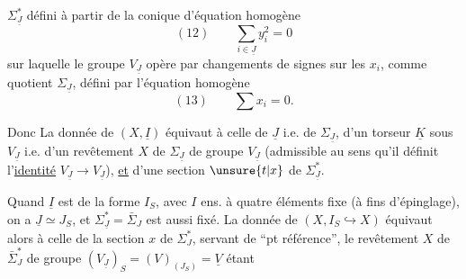 $\Sigma^*_{\underline J}$ défini  à partir de la  conique  d'équation homogène
\[
(12)\qquad\sum_{i\in\underline J}y_i^2=0
\]
sur laquelle le groupe $V_{\underline J}$  opère  par changements de signes sur les $x_i$,  comme quotient $\Sigma_{\underline J}$, défini par l'équation homogène
\[
(13)\qquad\sum x_i=0.
\]

Donc La donnée de $(X,\underline I)$ équivaut à celle de \deleted{\unsure{$\Sigma$}} $\underline J$ i.e. de $\Sigma_{\underline J}$, d'un torseur $\underline K$ sous $V_{\underline J}$ i.e. d'un revêtement $X$ de $\Sigma_{\underline J}$  de groupe $V_{\underline J}$ (admissible au sens qu'il définit l'\uline{identité} $V_{\underline J}\longrightarrow V_{\underline J}$), \uline{et} d'une section $\unsure{t|x}$ de $\Sigma^*_{\underline J}$.

Quand $\underline I$ est  de la forme $I_S$, avec $I$ ens. à quatre éléments fixe (à fins d'épinglage), on a $\underline J\simeq J_S$, et $\Sigma^*_{\underline J}=\bar\Sigma_J$ est aussi fixé. La donnée de $(X,I_S\hookrightarrow X)$ équivaut alors à celle de la section $x$ de $\Sigma^*_J$, servant de ``pt référence'', le revêtement $X$ de $\bar\Sigma^*_J$ de groupe $(V_{\underline J})_S=(V)_{(J_S)}=\underline V$ étant

